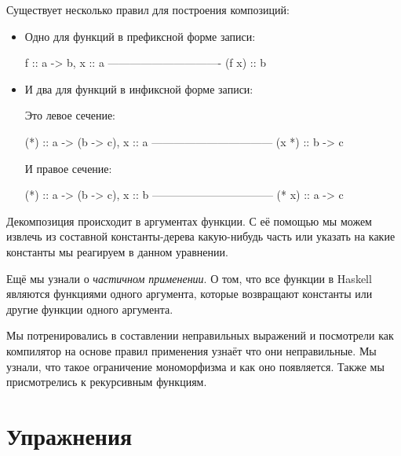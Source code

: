 Существует несколько правил для построения композиций:

\begin{itemize}
\item
  Одно для функций в префиксной форме записи:


  \begin{code}
                      f :: a -> b,           x :: a 
                      -------------------------------
                                (f x) :: b
  \end{code}
\item
  И два для функций в инфиксной форме записи:

  Это левое сечение:


  \begin{code}
                      (*) :: a -> (b -> c),     x :: a 
                      ---------------------------------
                               (x *) :: b -> c
  \end{code}

  И правое сечение:


  \begin{code}
                      (*) :: a -> (b -> c),     x :: b 
                      ---------------------------------
                                  (* x) :: a -> c
  \end{code}
\end{itemize}

Декомпозиция происходит в аргументах функции. С её помощью мы можем
извлечь из составной константы-дерева какую-нибудь часть или указать на
какие константы мы реагируем в данном уравнении.

Ещё мы узнали о \emph{частичном применении}. О том, что все функции в
Haskell являются функциями одного аргумента, которые возвращают
константы или другие функции одного аргумента.

Мы потренировались в составлении неправильных выражений и посмотрели как
компилятор на основе правил применения узнаёт что они неправильные. Мы
узнали, что такое ограничение мономорфизма и как оно появляется. Также
мы присмотрелись к рекурсивным функциям.


\section{Упражнения}

